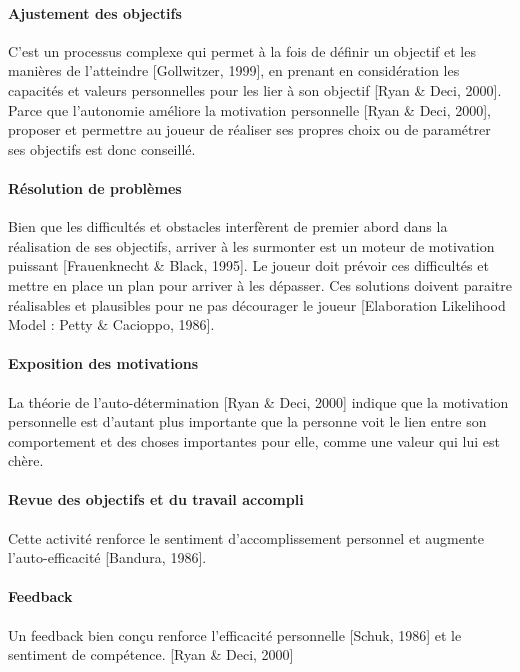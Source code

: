 			\paragraph{Ajustement des objectifs \\ \quad}
C’est un processus complexe qui permet à la fois de définir un objectif et les manières de l’atteindre [Gollwitzer, 1999], en prenant en considération les capacités et valeurs personnelles pour les lier à son objectif [Ryan \& Deci, 2000]. Parce que l’autonomie améliore la motivation personnelle [Ryan \& Deci, 2000], proposer et permettre au joueur de réaliser ses propres choix ou de paramétrer ses objectifs est donc conseillé.
			\paragraph{Résolution de problèmes \\ \quad}
Bien que les difficultés et obstacles interfèrent de premier abord dans la réalisation de ses objectifs, arriver à les surmonter est un moteur de motivation puissant [Frauenknecht \& Black, 1995]. Le joueur doit prévoir ces difficultés et mettre en place un plan pour arriver à les dépasser. Ces solutions doivent paraitre réalisables et plausibles pour ne pas décourager le joueur [Elaboration Likelihood Model : Petty \& Cacioppo, 1986].
			\paragraph{Exposition des motivations \\ \quad}
La théorie de l’auto-détermination [Ryan \& Deci, 2000] indique que la motivation personnelle est d’autant plus importante que la personne voit le lien entre son comportement et des choses importantes pour elle, comme une valeur qui lui est chère.
			\paragraph{Revue des objectifs et du travail accompli\\ \quad}
Cette activité renforce le sentiment d’accomplissement personnel et augmente l’auto-efficacité [Bandura, 1986].
			\paragraph{Feedback \\ \quad}
Un feedback bien conçu renforce l’efficacité personnelle [Schuk, 1986] et le sentiment de compétence. [Ryan \& Deci, 2000]
			
